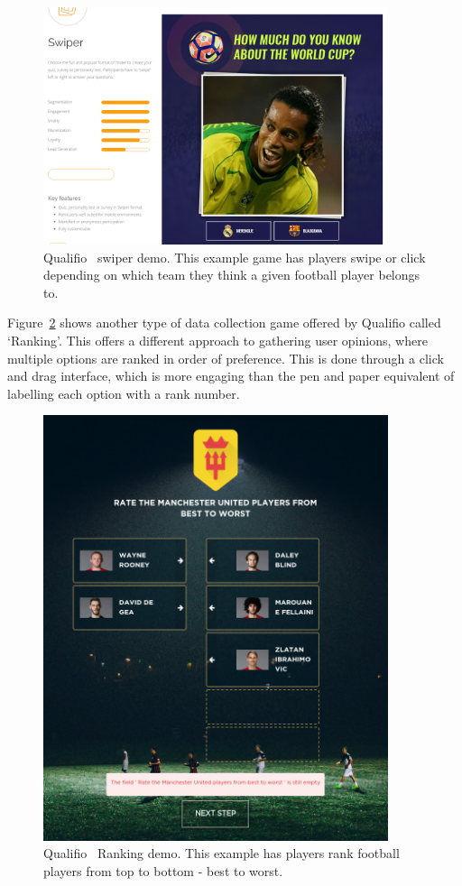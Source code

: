 \begin{figure}[!h]
	\centering
	\includegraphics[width=0.9\textwidth]{./images/context/qual.png}
	\caption{Qualifio~\cite{Qualifio} swiper demo. This example game has players swipe or click depending on which team they think a given football player belongs to.}
	\label{fig:qual}
\end{figure}

Figure~\ref{fig:unit} shows another type of data collection game offered by Qualifio called `Ranking'. 
This offers a different approach to gathering user opinions, where multiple options are ranked in order of preference.
This is done through a click and drag interface, which is more engaging than the pen and paper equivalent of labelling each option with a rank number. 

\begin{figure}[!h]
	\centering
	\includegraphics[width=0.9\textwidth]{./images/context/united.png}
	\caption{Qualifio~\cite{Qualifio} Ranking demo. This example has players rank football players from top to bottom - best to worst.}
	\label{fig:unit}
\end{figure}

